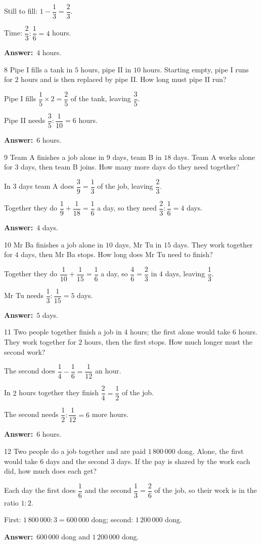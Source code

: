 \documentclass[11pt]{article}
\newif\ifsol \solfalse
\providecommand{\AnsWord}{Đáp số}
\newcommand{\dapso}[1]{\par\textbf{\AnsWord:}\ #1}
\newcommand{\probsol}[1]{%
  \begin{lrbox}{\solmeasure}\begin{minipage}{\dimexpr\linewidth-24pt\relax}#1\end{minipage}\end{lrbox}%
  \ifsol
    \begin{solbox}#1\end{solbox}%
  \else
    \setlength{\solht}{\dimexpr\ht\solmeasure+\dp\solmeasure+0.85cm\relax}%
    \ifdim\solht<1.35cm\setlength{\solht}{1.35cm}\fi
    \begin{tcolorbox}[colback=white,colframe=Line,boxrule=0.8pt,arc=5pt,
      left=8pt,right=8pt,top=4pt,bottom=4pt,height=\solht]{\footnotesize\color{Slate}\itshape\WorkWord}\end{tcolorbox}%
  \fi}
\newcommand{\gap}{\vspace{0.3cm}}
\def\WorkWord{Your work:}
\def\AnsWord{Answer}
\begin{document}
\probsol{
Still to fill: $1-\dfrac13=\dfrac23$.\par Time: $\dfrac23:\dfrac16=4$ hours.
\dapso{$4$ hours.}}
\gap
\begin{probbox}{8}{\relax}
Pipe I fills a tank in $5$ hours, pipe II in $10$ hours. Starting empty, pipe I runs for $2$ hours and is then replaced by pipe II. How long must pipe II run?
\end{probbox}
\probsol{
Pipe I fills $\dfrac15\times2=\dfrac25$ of the tank, leaving $\dfrac35$.\par Pipe II needs $\dfrac35:\dfrac1{10}=6$ hours.
\dapso{$6$ hours.}}
\gap
\begin{probbox}{9}{\relax}
Team A finishes a job alone in $9$ days, team B in $18$ days. Team A works alone for $3$ days, then team B joins. How many more days do they need together?
\end{probbox}
\probsol{
In $3$ days team A does $\dfrac39=\dfrac13$ of the job, leaving $\dfrac23$.\par
Together they do $\dfrac19+\dfrac1{18}=\dfrac16$ a day, so they need $\dfrac23:\dfrac16=4$ days.
\dapso{$4$ days.}}
\gap
\begin{probbox}{10}{\relax}
Mr Ba finishes a job alone in $10$ days, Mr Tu in $15$ days. They work together for $4$ days, then Mr Ba stops. How long does Mr Tu need to finish?
\end{probbox}
\probsol{
Together they do $\dfrac1{10}+\dfrac1{15}=\dfrac16$ a day, so $\dfrac46=\dfrac23$ in $4$ days, leaving $\dfrac13$.\par
Mr Tu needs $\dfrac13:\dfrac1{15}=5$ days.
\dapso{$5$ days.}}
\gap
\begin{probbox}{11}{\relax}
Two people together finish a job in $4$ hours; the first alone would take $6$ hours. They work together for $2$ hours, then the first stops. How much longer must the second work?
\end{probbox}
\probsol{
The second does $\dfrac14-\dfrac16=\dfrac1{12}$ an hour.\par In $2$ hours together they finish $\dfrac24=\dfrac12$ of the job.\par
The second needs $\dfrac12:\dfrac1{12}=6$ more hours.
\dapso{$6$ hours.}}
\gap
\begin{probbox}{12}{\relax}
Two people do a job together and are paid $1\,800\,000$ dong. Alone, the first would take $6$ days and the second $3$ days. If the pay is shared by the work each did, how much does each get?
\end{probbox}
\probsol{
Each day the first does $\dfrac16$ and the second $\dfrac13=\dfrac26$ of the job, so their work is in the ratio $1:2$.\par
First: $1\,800\,000:3=600\,000$ dong; second: $1\,200\,000$ dong.
\dapso{$600\,000$ dong and $1\,200\,000$ dong.}}
\end{document}
